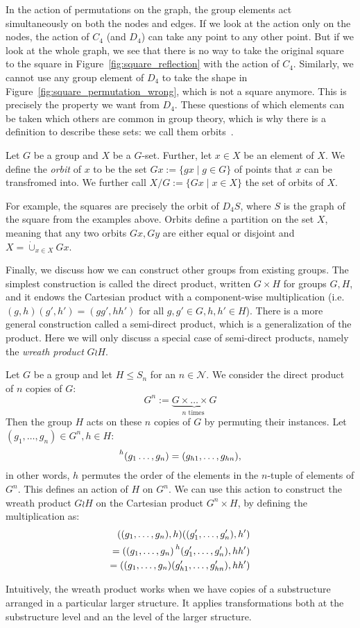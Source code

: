 In the action of permutations on the graph, the group elements act simultaneously on both the nodes and edges.
If we look at the action only on the nodes, the action of $C_4$  (and $D_4$) can take any point to any other point.
But if we look at the whole graph, we see that there is no way to take the original square to the square in Figure~\ref{fig:square_reflection} with the action of $C_4$.
Similarly, we cannot use any group element of $D_4$ to take the shape in Figure~\ref{fig:square_permutation_wrong}, which is not a square anymore.
This is precisely the property we want from $D_4$. 
These questions of which elements can be taken which others are common in group theory, which is why there is a definition to describe these sets: we call them orbits~.

\begin{defn}
Let $G$ be a group and $X$ be a $G$-set. Further, let $x \in X$ be an element of $X$. 
We define the \emph{orbit} of $x$ to be the set $Gx := \{ gx \mid g \in G\}$ of points that $x$ can be transfromed into.
We further call $X / G := \{ Gx \mid x \in X \}$ the set of orbits of $X$.
\end{defn}

For example, the squares are precisely the orbit of $D_4 S$, where $S$ is the graph of the square from the examples above.
Orbits define a partition on the set $X$, meaning that any two orbits $Gx, Gy$ are either equal or disjoint and $X = \dot{\cup}_{x \in X} Gx$.

Finally, we discuss how we can construct other groups from existing groups.
The simplest construction is called the direct product, written $G \times H$ for groups $G,H$, and it endows the Cartesian product with a component-wise multiplication (i.e. $(g,h)(g',h') = (gg',hh')$ for all $g,g' \in G, h,h' \in H$).
There is a more general construction called a semi-direct product, which is a generalization of the product. 
Here we will only discuss a special case of semi-direct products, namely the \emph{wreath product} $G \wr H$.

Let $G$ be a group and let $H \leq S_n$ for an $n \in \mathcal{N}$.
We consider the direct product of $n$ copies of $G$: 
\[ G^n := \underbrace{G \times \ldots \times G}_{n \text{ times }} \]
Then the group $H$ acts on these $n$ copies of $G$ by permuting their instances. Let $(g_1,\ldots,g_n) \in G^n, h \in H$:
\[ \prescript{h}{} (g_1 \ldots, g_n) = (g_{h1},\ldots,g_{hn}), \] 
in other words, $h$ permutes the order of the elements in the $n$-tuple of elements of $G^n$.
This defines an action of $H$ on $G^n$.
We can use this action to construct the wreath product $G \wr H$ on the Cartesian product $G^n \times H$, by defining the multiplication as:
\begin{align*} ((g_1,\ldots,g_n),h)((g'_1,\ldots,g'_n),h') \\
  = ((g_1,\ldots,g_n) \prescript{h}{}(g'_1,\ldots,g'_n),hh') \\
  = ((g_1,\ldots,g_n) (g'_{h1},\ldots,g'_{hn}),hh') \end{align*}

Intuitively, the wreath product works when we have copies of a substructure arranged in a particular larger structure.
It applies transformations both at the substructure level and an the level of the larger structure. 
